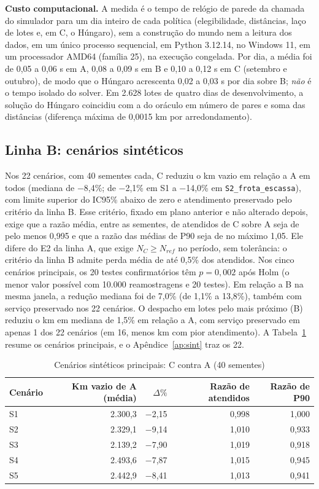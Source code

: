\textbf{Custo computacional.} A medida é o tempo de relógio de parede da chamada do simulador para um dia inteiro de cada política (elegibilidade, distâncias, laço de lotes e, em C, o Húngaro), sem a construção do mundo nem a leitura dos dados, em um único processo sequencial, em Python 3.12.14, no Windows 11, em um processador AMD64 (família 25), na execução congelada. Por dia, a média foi de 0,05 a 0,06 s em A, 0,08 a 0,09 s em B e 0,10 a 0,12 s em C (setembro e outubro), de modo que o Húngaro acrescenta 0,02 a 0,03 s por dia sobre B; \emph{não} é o tempo isolado do solver. Em 2.628 lotes de quatro dias de desenvolvimento, a solução do Húngaro coincidiu com a do oráculo em número de pares e soma das distâncias (diferença máxima de 0,0015 km por arredondamento).

\subsection{Linha B: cenários sintéticos}

Nos 22 cenários, com 40 sementes cada, C reduziu o km vazio em relação a A em todos (mediana de −8,4\%; de −2,1\% em S1 a −14,0\% em \texttt{S2\_frota\_escassa}), com limite superior do IC95\% abaixo de zero e atendimento preservado pelo critério da linha B. Esse critério, fixado em plano anterior e não alterado depois, exige que a razão média, entre as sementes, de atendidos de C sobre A seja de pelo menos 0,995 e que a razão das médias de P90 seja de no máximo 1,05. Ele difere do E2 da linha A, que exige $N_C\ge N_{ref}$ no período, sem tolerância: o critério da linha B admite perda média de até 0,5\% dos atendidos. Nos cinco cenários principais, os 20 testes confirmatórios têm $p=0{,}002$ após Holm (o menor valor possível com 10.000 reamostragens e 20 testes). Em relação a B na mesma janela, a redução mediana foi de 7,0\% (de 1,1\% a 13,8\%), também com serviço preservado nos 22 cenários. O despacho em lotes pelo mais próximo (B) reduziu o km em mediana de 1,5\% em relação a A, com serviço preservado em apenas 1 dos 22 cenários (em 16, menos km com pior atendimento). A Tabela~\ref{tab:sint} resume os cenários principais, e o Apêndice~\ref{ap:sint} traz os 22.

\begin{table}[!htb]
\caption{Cenários sintéticos principais: C contra A (40 sementes)}\label{tab:sint}
\centering\fontetabela
\begin{tabular}{@{}lrrrr@{}}
\toprule
Cenário & Km vazio de A (média) & $\Delta\%$ & Razão de atendidos & Razão de P90 \\
\midrule
S1 & 2.300,3 & −2,15 & 0,998 & 1,000 \\
S2 & 2.329,1 & −9,14 & 1,010 & 0,933 \\
S3 & 2.139,2 & −7,90 & 1,019 & 0,918 \\
S4 & 2.493,6 & −7,87 & 1,015 & 0,945 \\
S5 & 2.442,9 & −8,41 & 1,013 & 0,941 \\
\bottomrule
\end{tabular}
\end{table}

